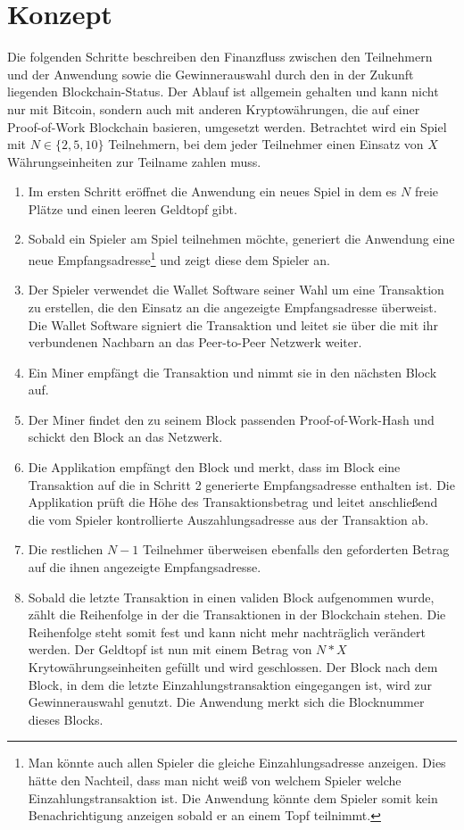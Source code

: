 \section{Konzept}

Die folgenden Schritte beschreiben den Finanzfluss zwischen den Teilnehmern und der Anwendung sowie die Gewinnerauswahl durch den in der Zukunft liegenden Blockchain-Status. Der Ablauf ist allgemein gehalten und kann nicht nur mit Bitcoin, sondern auch mit anderen Kryptowährungen, die auf einer Proof-of-Work Blockchain basieren, umgesetzt werden. Betrachtet wird ein Spiel mit $N \in \{2,5,10\}$ Teilnehmern, bei dem jeder Teilnehmer einen Einsatz von $X$ Währungseinheiten zur Teilname zahlen muss. 

\begin{enumerate}
\item Im ersten Schritt eröffnet die Anwendung ein neues Spiel in dem es $N$ freie Plätze und einen leeren Geldtopf gibt.
\item Sobald ein Spieler am Spiel teilnehmen möchte, generiert die Anwendung eine neue Empfangsadresse\footnote{Man könnte auch allen Spieler die gleiche Einzahlungsadresse anzeigen. Dies hätte den Nachteil, dass man nicht weiß von welchem Spieler welche Einzahlungstransaktion ist. Die Anwendung könnte dem Spieler somit kein Benachrichtigung anzeigen sobald er an einem Topf teilnimmt.} und zeigt diese dem Spieler an.
\item Der Spieler verwendet die Wallet Software seiner Wahl um eine Transaktion zu erstellen, die den Einsatz an die angezeigte Empfangsadresse überweist. Die Wallet Software signiert die Transaktion und leitet sie über die mit ihr verbundenen Nachbarn an das Peer-to-Peer Netzwerk weiter.
\item Ein Miner empfängt die Transaktion und nimmt sie in den nächsten Block auf.
\item Der Miner findet den zu seinem Block passenden Proof-of-Work-Hash und schickt den Block an das Netzwerk.
\item Die Applikation empfängt den Block und merkt, dass im Block eine Transaktion auf die in Schritt 2 generierte Empfangsadresse enthalten ist. Die Applikation prüft die Höhe des Transaktionsbetrag und leitet anschließend die vom Spieler kontrollierte Auszahlungsadresse aus der Transaktion ab. 
\item  Die restlichen $N-1$ Teilnehmer überweisen ebenfalls den geforderten Betrag auf die ihnen angezeigte Empfangsadresse.
\item  Sobald die letzte Transaktion in einen validen Block aufgenommen wurde, zählt die Reihenfolge in der die Transaktionen in der Blockchain stehen. Die Reihenfolge steht somit fest und kann nicht mehr nachträglich verändert werden. Der Geldtopf ist nun mit einem Betrag von $N*X$ Krytowährungseinheiten gefüllt und wird geschlossen. Der Block nach dem Block, in dem die letzte Einzahlungstransaktion eingegangen ist, wird zur Gewinnerauswahl genutzt. Die Anwendung merkt sich die Blocknummer dieses Blocks.

\end{enumerate}
